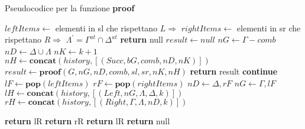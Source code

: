 \documentclass[\main/tesi.tex]{subfiles}
\begin{document}
\begin{algorithm}
    \caption{Pseudocodice per la funzione \textbf{proof}}\label{alg:proof}
    \begin{algorithmic}
        \State $leftItems \gets $ elementi in sl che rispettano $L\Rightarrow$
        \State $rightItems \gets $ elementi in sr che rispettano $R\Rightarrow$
        \State $\Lambda^{'} = \Gamma^{at} \cap \Delta^{at}$
        \State \textbf{return} null
        \Else
        \State $result \gets null$
        \State $nG \gets \Gamma - comb$
        \State $nD \gets \Delta \cup \Lambda$
        \State $nK \gets k + 1$
        \State $nH \gets \textbf{concat}(history, [(Succ, bG, comb, nD, nK)])$
        \State $result \gets \textbf{proof}(G, nG, nD, comb, sl, sr, nK, nH)$
        \State \textbf{return} result
        \Else
        \State \textbf{continue}
        \EndIf
        \EndFor
        \EndIf
        \Else
        \State $lF \gets \textbf{pop}(leftItems)$
        \State $rF \gets \textbf{pop}(rightItems)$
        \State $nD \gets \Delta, rF$
        \State $nG \gets \Gamma, lF$
        \State $lH \gets \textbf{concat}(history, [(Left, nG, \Lambda, \Delta, k)])$
        \State $rH \gets \textbf{concat}(history, [(Right, \Gamma, \Lambda, nD, k)])$

        \State \textbf{return} lR
        \State \textbf{return} rR
        \State \textbf{return} lR
        \Else
        \State \textbf{return} null
        \EndIf
        \EndIf
        \EndWhile
        \EndFunction
    \end{algorithmic}
\end{algorithm}
\end{document}
